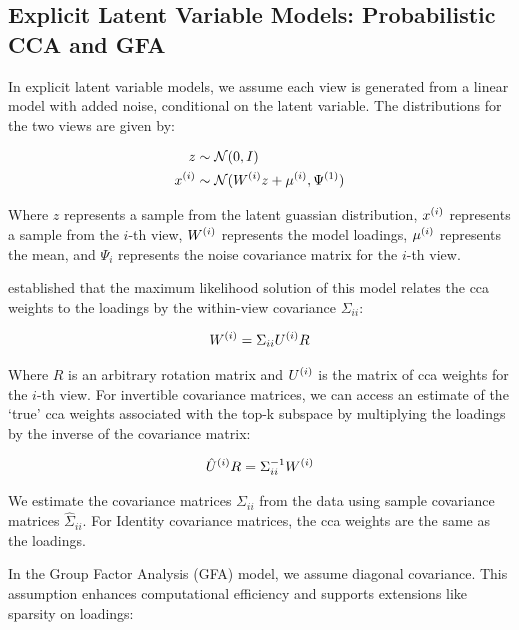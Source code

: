 \subsection{Explicit Latent Variable Models: Probabilistic CCA and GFA}

In explicit latent variable models, we assume each view is generated from a linear model with added noise, conditional on the latent variable.
The distributions for the two views are given by:

\begin{align}
    z &\sim \mathcal{N}(0, I)\\
    x^{(i)} &\sim \mathcal{N}(W^{(i)} z + \mu^{(i)}, \Psi^{(1)})
\end{align}

Where \(z\) represents a sample from the latent guassian distribution, \(x^{(i)}\) represents a sample from the \(i\)-th view, \(W^{(i)}\) represents the model loadings, \(\mu^{(i)}\) represents the mean, and \(\Psi_{i}\) represents the noise covariance matrix for the \(i\)-th view.

\citet{bach2005probabilistic} established that the maximum likelihood solution of this model relates the \acrshort{cca} weights to the loadings by the within-view covariance \(\Sigma_{ii}\):

\begin{align}\label{eq:weights-to-loadings}
    W^{(i)} = \Sigma_{ii} U^{(i)} R
\end{align}

Where \(R\) is an arbitrary rotation matrix and \(U^{(i)}\) is the matrix of \acrshort{cca} weights for the \(i\)-th view.
For invertible covariance matrices, we can access an estimate of the `true' \acrshort{cca} weights associated with the top-k subspace by multiplying the loadings by the inverse of the covariance matrix:

\begin{align}\label{eq:loadings-to-weights}
    \hat{U}^{(i)}R = \Sigma_{ii}^{-1} W^{(i)}
\end{align}

We estimate the covariance matrices \(\Sigma_{ii}\) from the data using sample covariance matrices \(\hat{\Sigma}_{ii}\).
For Identity covariance matrices, the \acrshort{cca} weights are the same as the loadings.

In the Group Factor Analysis (GFA) model, we assume diagonal covariance.
This assumption enhances computational efficiency and supports extensions like sparsity on loadings:

